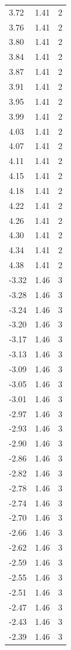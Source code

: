 \begin{longtable}{lrr}
  3.72 & 1.41 & 2 \\
  3.76 & 1.41 & 2 \\
  3.80 & 1.41 & 2 \\
  3.84 & 1.41 & 2 \\
  3.87 & 1.41 & 2 \\
  3.91 & 1.41 & 2 \\
  3.95 & 1.41 & 2 \\
  3.99 & 1.41 & 2 \\
  4.03 & 1.41 & 2 \\
  4.07 & 1.41 & 2 \\
  4.11 & 1.41 & 2 \\
  4.15 & 1.41 & 2 \\
  4.18 & 1.41 & 2 \\
  4.22 & 1.41 & 2 \\
  4.26 & 1.41 & 2 \\
  4.30 & 1.41 & 2 \\
  4.34 & 1.41 & 2 \\
  4.38 & 1.41 & 2 \\
  -3.32 & 1.46 & 3 \\
  -3.28 & 1.46 & 3 \\
  -3.24 & 1.46 & 3 \\
  -3.20 & 1.46 & 3 \\
  -3.17 & 1.46 & 3 \\
  -3.13 & 1.46 & 3 \\
  -3.09 & 1.46 & 3 \\
  -3.05 & 1.46 & 3 \\
  -3.01 & 1.46 & 3 \\
  -2.97 & 1.46 & 3 \\
  -2.93 & 1.46 & 3 \\
  -2.90 & 1.46 & 3 \\
  -2.86 & 1.46 & 3 \\
  -2.82 & 1.46 & 3 \\
  -2.78 & 1.46 & 3 \\
  -2.74 & 1.46 & 3 \\
  -2.70 & 1.46 & 3 \\
  -2.66 & 1.46 & 3 \\
  -2.62 & 1.46 & 3 \\
  -2.59 & 1.46 & 3 \\
  -2.55 & 1.46 & 3 \\
  -2.51 & 1.46 & 3 \\
  -2.47 & 1.46 & 3 \\
  -2.43 & 1.46 & 3 \\
  -2.39 & 1.46 & 3 \\

\end{longtable}
